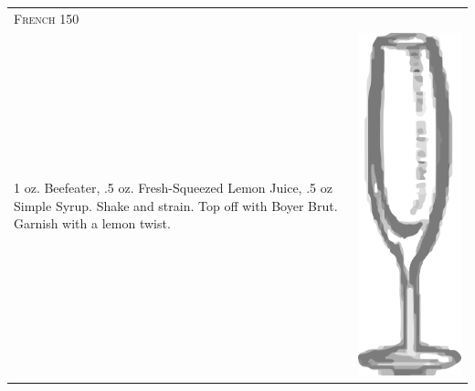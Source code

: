 \documentclass{article}
\begin{document}
\begin{multicols}{2}
\begin{tabular}{p{2in} p{0.5in}}
\multicolumn{2}{p{3in}}{\centering\Huge\textsc{French 150}}\\ 
   \vspace{-0.1in}1 oz. Beefeater, .5 oz. Fresh-Squeezed Lemon Juice, .5 oz Simple Syrup. Shake and strain. Top off with Boyer Brut. Garnish with a lemon twist. &
   \vspace{-0.1in} \includegraphics{flute.png}
\end{tabular}


\end{multicols}
\end{document}
